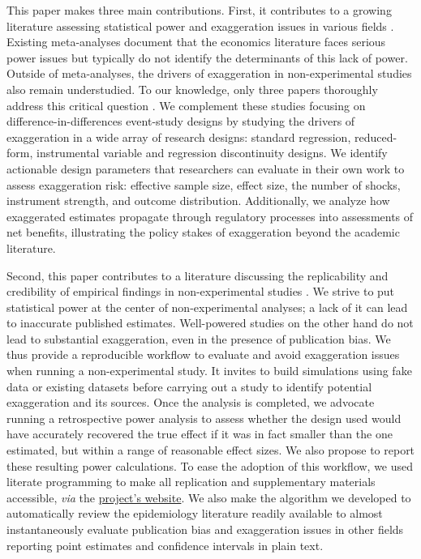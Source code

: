 \documentclass[12pt]{article}
\begin{document}
		 This paper makes three main contributions. First, it contributes to a growing literature assessing statistical power and exaggeration issues in various fields \citep{ioannidis_why_2008, gelman_beyond_2014, ioannidis_power_2017, ferraro_feature_2020, stommes_reliability_2023, arel-bundock_quantitative_2024}. Existing meta-analyses document that the economics literature faces serious power issues but typically do not identify the determinants of this lack of power. Outside of meta-analyses, the drivers of exaggeration in non-experimental studies also remain understudied. To our knowledge, only three papers thoroughly address this critical question \citep{schell_evaluating_2018, griffin_moving_2021, black_simulated_2022}. We complement these studies focusing on difference-in-differences event-study designs by studying the drivers of exaggeration in a wide array of research designs: standard regression, reduced-form, instrumental variable and regression discontinuity designs. We identify actionable design parameters that researchers can evaluate in their own work to assess exaggeration risk: effective sample size, effect size, the number of shocks, instrument strength, and outcome distribution. Additionally, we analyze how exaggerated estimates propagate through regulatory processes into assessments of net benefits, illustrating the policy stakes of exaggeration beyond the academic literature.
		 
		 Second, this paper contributes to a literature discussing the replicability and credibility of empirical findings in non-experimental studies \citep{button_power_2013, open_science_collaboration_estimating_2015, christensen_transparency_2018, camerer_evaluating_2016, brodeur_methods_2020, brodeur_mass_2024}. We strive to put statistical power at the center of non-experimental analyses; a lack of it can lead to inaccurate published estimates. Well-powered studies on the other hand do not lead to substantial exaggeration, even in the presence of publication bias. We thus provide a reproducible workflow to evaluate and avoid exaggeration issues when running a non-experimental study. It invites to build simulations using fake data or existing datasets before carrying out a study to identify potential exaggeration and its sources. Once the analysis is completed, we advocate running a retrospective power analysis to assess whether the design used would have accurately recovered the true effect if it was in fact smaller than the one estimated, but  within a range of reasonable effect sizes. We also propose to report these resulting power calculations. To ease the adoption of this workflow, we used literate programming to make all replication and supplementary materials accessible, \textit{via} the \href{https://vincentbagilet.github.io/inference_pollution/}{project's website}. We also make the algorithm we developed to automatically review the epidemiology literature readily available to almost instantaneously evaluate publication bias and exaggeration issues in other fields reporting point estimates and confidence intervals in plain text.
		 
\end{document}
